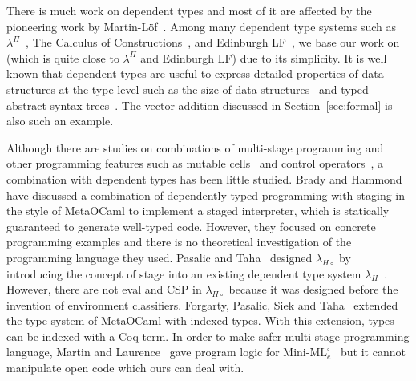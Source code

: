 
There is much work on dependent types and most of it are affected by
the pioneering work by Martin-L\"{o}f~\cite{martin1973intuitionistic}.
Among many dependent type systems such as
$\lambda^\Pi$~\cite{Meyer1986}, The Calculus of
Constructions~\cite{coquand:inria-00076024}, and Edinburgh
LF~\cite{harper1993framework}, we base our work on \LLF~\cite{attapl}
(which is quite close to $\lambda^\Pi$ and Edinburgh LF) due to its
simplicity.  It is well known that dependent types are useful to
express detailed properties of data structures at the type level such
as the size of data structures~\cite{Xi98} and typed abstract syntax
trees~\cite{DBLP:conf/dsl/LeijenM99,DBLP:conf/popl/XiCC03}.  The
vector addition discussed in Section~\ref{sec:formal} is also such an
example.




Although there are studies on combinations of multi-stage programming and
other programming features such as mutable cells~\cite{kiselyov2016refined}
and control operators~\cite{KameyamaKiselyovShan09PEPM,oishi2017staging}, a
combination with dependent types has been little studied.  Brady
and Hammond~\cite{brady2006dependently} have discussed a combination of
dependently typed programming with staging in the style of MetaOCaml to
implement a staged interpreter, which is statically guaranteed to generate
well-typed code. However, they focused on concrete programming examples and
there is no theoretical investigation of the programming language they used.
Pasalic and Taha~\cite{pasalic2002tagless} designed \(\lambda_{H\circ}\) by
introducing the concept of stage into an existing dependent type system
\(\lambda_H\)~\cite{zhong2002certified}. However, there are not eval and CSP
in \(\lambda_{H\circ}\) because it was designed before the invention of
environment classifiers. Forgarty, Pasalic, Siek and
Taha~\cite{fogarty2007concoqtion} extended the type system of MetaOCaml with
indexed types. With this extension, types can be indexed with a Coq term. In
order to make safer multi-stage programming language, Martin and
Laurence~\cite{martin2015HGRTMP} gave program logic for
\(\text{Mini-ML}^\square_e\)~\cite{DaviesPfenning01JACM} but it cannot
manipulate open code which ours can deal with. 

